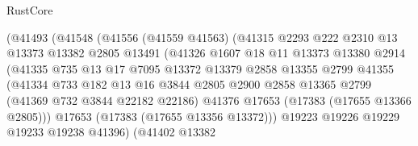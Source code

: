 \begin{lexlean}{RustCore}
\begin{coremodule}
                            (@41493
                              (@41548
                                (@41556
                                  (@41559 @41563)
                                  (@41315
                                    @2293
                                    @222
                                    @2310
                                    @13
                                    @13373
                                    @13382
                                    @2805
                                    @13491
                                    (@41326
                                      @1607
                                      @18
                                      @11
                                      @13373
                                      @13380
                                      @2914
                                      (@41335
                                        @735
                                        @13
                                        @17
                                        @7095
                                        @13372
                                        @13379
                                        @2858
                                        @13355
                                        @2799
                                        @41355
                                        (@41334
                                          @733
                                          @182
                                          @13
                                          @16
                                          @3844
                                          @2805
                                          @2900
                                          @2858
                                          @13365
                                          @2799
                                          (@41369 @732 @3844 @22182 @22186)
                                          @41376
                                          @17653
                                          (@17383 (@17655 @13366 @2805)))
                                        @17653
                                        (@17383 (@17655 @13356 @13372)))
                                      @19223
                                      @19226
                                      @19229
                                      @19233
                                      @19238
                                      @41396)
                                    (@41402
                                      @13382

\end{coremodule}
\end{lexlean}
